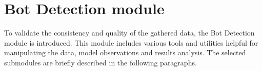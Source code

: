 \section{Bot Detection module}\label{sec:bot-detection-module}
To validate the consistency and quality of the gathered data, the Bot Detection module is introduced.
This module includes various tools and utilities helpful for manipulating the data, model observations and results analysis.
The selected submodules are briefly described in the following paragraphs.